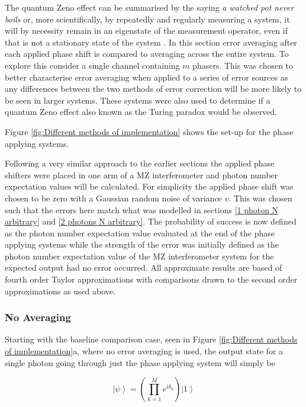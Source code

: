 \documentclass[aps,pra,twocolumn,superscriptaddress,numerical]{revtex4-1}
\begin{document}
		The quantum Zeno effect can be summarised by the saying \textit{a watched pot never boils} or, more scientifically, by repeatedly and regularly measuring a system, it will by necessity remain in an eigenstate of the measurement operator, even if that is not a stationary state of the system \cite{expZeno}. In this section error averaging after each applied phase shift is compared to averaging across the entire system. To explore this consider a single channel containing $m$ phasers. This was chosen to better characterise error averaging when applied to a series of error sources as any differences between the two methods of error correction will be more likely to be seen in larger systems. These systems were also used to determine if a quantum Zeno effect also known as the Turing paradox would be observed.
						
		Figure \ref{fig:Different methods of implementation} shows the set-up for the phase applying systems.
			
		Following a very similar approach to the earlier sections the applied phase shifters were placed in one arm of a MZ interferometer and photon number expectation values will be calculated. For simplicity the applied phase shift was chosen to be zero with a Gaussian random noise of variance $v$. This was chosen such that the errors here match what was modelled in sections \ref{1 photon N arbitrary} and \ref{2 photons N arbitrary}. The probability of success is now defined as the photon number expectation value evaluated at the end of the phase applying systems while the strength of the error was initially defined as the photon number expectation value of the MZ interferometer system for the expected output had no error occurred. All approximate results are based of fourth order Taylor approximations with comparisons drawn to the second order approximations as used above.
			
			
		\subsubsection{No Averaging\label{No Averaging}}
			
			Starting with the baseline comparison case, seen in Figure \ref{fig:Different methods of implementation}a, where no error averaging is used, the output state for a single photon going through just the phase applying system will simply be
						
			\begin{equation}
				\left|\psi\right\rangle =\left(\prod_{k=1}^{M}e^{i\delta_{k}}\right)\left|1\right\rangle \label{eq:noAvPhaseState}
			\end{equation}
			
\end{document}
